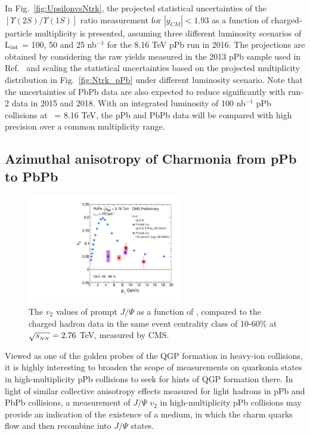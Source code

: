 In Fig.~\ref{fig:UpsilonvsNtrk}, the projected statistical uncertainties 
of the $[\Upsilon(2S) / \Upsilon(1S)]$ ratio measurement for $|y_{CM}|<1.93$ as a 
function of charged-particle multiplicity is presented, assuming three different 
luminosity scenarios of L$_{\rm int}$ = 100, 50 and 25 nb$^{-1}$ for the 8.16 TeV pPb run in 2016. 
The projections are obtained by considering the raw yields measured in the 2013 pPb 
sample used in Ref.~\cite{Chatrchyan:2013nza} and scaling the statistical uncertainties 
based on the projected multiplicity distribution in Fig.~\ref{fig:Ntrk_pPb} under
different luminosity scenario. Note that the uncertainties of PbPb data are also expected to
reduce significantly with run-2 data in 2015 and 2018. With an integrated luminosity of 
100 nb$^{-1}$ pPb collisions at \rootsNN\ = 8.16 TeV, the pPb and PbPb data
will be compared with high precision over a common multiplicity range.


\subsection{Azimuthal anisotropy of Charmonia from pPb to PbPb}


\begin{figure}[thb]
  \begin{center}
    \includegraphics[width=0.6\textwidth]{figures/comp_v2_pTs_CMSflow_Prp_Cor.pdf}
    \caption{ The $v_2$ values of prompt $J/\Psi$ as a function of \pt, compared to the 
    charged hadron data in the same event centrality class of 10-60\% at $\sqrt{s_{_{NN}}} = 2.76$ TeV,
    measured by CMS.}
    \label{fig:v2_Jpsi}
  \end{center}
\end{figure} 

Viewed as one of the golden probes of the QGP formation in heavy-ion collisions, it is highly
interesting to broaden the scope of measurements on quarkonia states in high-multiplicity pPb
collisions to seek for hints of QGP formation there. In light of similar 
collective anisotropy effects measured for light hadrons in pPb and PbPb collisions, 
a measurement of $J/\Psi$ $v_2$ in high-multiplicity pPb collisions may provide an 
indication of the existence of a medium, in which the charm quarks flow and then 
recombine into $J/\Psi$ states. 

